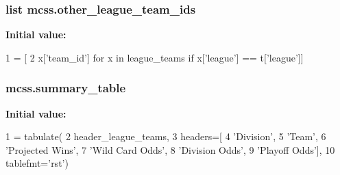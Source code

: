 \subsubsection[{\texorpdfstring{other\+\_\+league\+\_\+team\+\_\+ids}{other_league_team_ids}}]{\setlength{\rightskip}{0pt plus 5cm}list mcss.\+other\+\_\+league\+\_\+team\+\_\+ids}\hypertarget{namespacemcss_a348e552da07298068284f2e358fe9cf4}{}\label{namespacemcss_a348e552da07298068284f2e358fe9cf4}
{\bfseries Initial value\+:}
\begin{DoxyCode}
1 = [
2                     x[\textcolor{stringliteral}{'team\_id'}] \textcolor{keywordflow}{for} x \textcolor{keywordflow}{in} league\_teams \textcolor{keywordflow}{if} x[\textcolor{stringliteral}{'league'}] == t[\textcolor{stringliteral}{'league'}]]
\end{DoxyCode}
\subsubsection[{\texorpdfstring{summary\+\_\+table}{summary_table}}]{\setlength{\rightskip}{0pt plus 5cm}mcss.\+summary\+\_\+table}\hypertarget{namespacemcss_a60128f161d9bc999e29b667b81be2ba1}{}\label{namespacemcss_a60128f161d9bc999e29b667b81be2ba1}
{\bfseries Initial value\+:}
\begin{DoxyCode}
1 = tabulate(
2         header\_league\_teams,
3         headers=[
4             \textcolor{stringliteral}{'Division'},
5             \textcolor{stringliteral}{'Team'},
6             \textcolor{stringliteral}{'Projected Wins'},
7             \textcolor{stringliteral}{'Wild Card Odds'},
8             \textcolor{stringliteral}{'Division Odds'},
9             \textcolor{stringliteral}{'Playoff Odds'}],
10         tablefmt=\textcolor{stringliteral}{'rst'})
\end{DoxyCode}
